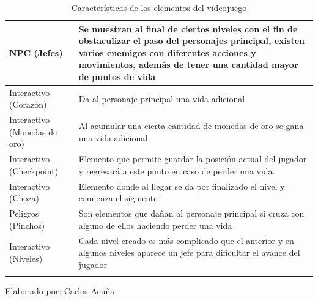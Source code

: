 \documentclass[a4paper, openright, 12pt]{report}
\begin{document}
\begin{enumerate}
\begin{longtable}{| p{4cm} | p{6cm} |}
NPC (Jefes) & Se muestran al final de ciertos niveles con el fin de obstaculizar el paso del personajes principal, existen varios enemigos con diferentes acciones y movimientos, además de tener una cantidad mayor de puntos de vida \\ \hline
Interactivo (Corazón) & Da al personaje principal una vida adicional \\ \hline
Interactivo (Monedas de oro) & Al acumular una cierta cantidad de monedas de oro se gana una vida adicional\\ \hline
Interactivo (Checkpoint) & Elemento que permite guardar la posición actual del jugador y regresará a este punto en caso de perder una vida.\\ \hline
Interactivo (Choza) & Elemento donde al llegar se da por finalizado el nivel y comienza el siguiente\\ \hline
Peligros (Pinchos) & Son elementos que dañan al personaje principal si cruza con alguno de ellos haciendo perder una vida\\ \hline
Interactivo (Niveles) & Cada nivel creado es más complicado que el anterior y en algunos niveles aparece un jefe para dificultar el avance del jugador\\ \hline
\caption{Características de los elementos del videojuego}
\label{t:elementosJuego}
\end{longtable}

\begin{center}
Elaborado por: Carlos Acuña
\end{center}


\end{enumerate}
\end{document}
